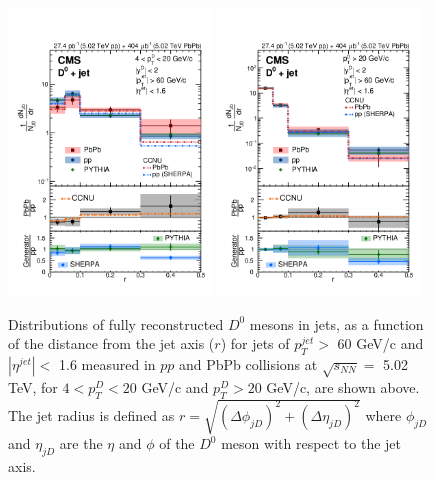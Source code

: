 \begin{figure}[hbtp]
\begin{center}
\includegraphics[width=0.48\textwidth]{Figures/Chapter2/CMSDJetLow.png}
\includegraphics[width=0.48\textwidth]{Figures/Chapter2/CMSDJetHigh.png}
\caption{Distributions of fully reconstructed $D^0$ mesons in jets, as a function of the distance from the jet axis ($r$) for jets of $p_T^{jet} >$ 60 GeV/c and $|\eta^{jet}| <$ 1.6 measured in $pp$ and PbPb collisions at $\sqrt{s_{NN}} = $ 5.02 TeV, for $4 < p_T^D < 20$ GeV/c and $p_T^D > 20$ GeV/c, are shown above. The jet radius is defined as $r = \sqrt{(\Delta \phi_{jD})^2 +  (\Delta \eta_{jD})^2 }$ where $\phi_{jD}$ and $\eta_{jD}$ are the $\eta$ and $\phi$ of the $D^0$ meson with respect to the jet axis.}
\label{DJETCorr}
\end{center}
\end{figure}   

